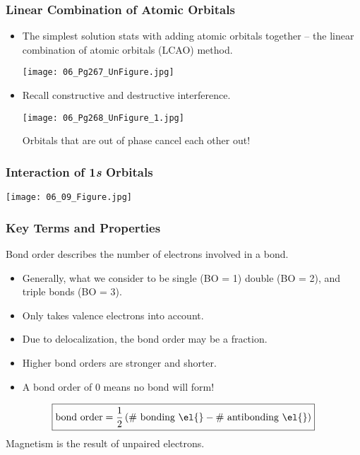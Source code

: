 \documentclass[handout]{beamer}
\begin{document}
\begin{frame}[t]
	\frametitle{Linear Combination of Atomic Orbitals}
	\begin{itemize}[<+->]
		\item The \alert{simplest} solution stats with adding atomic
			orbitals together -- the \alert{linear combination of
			atomic orbitals} (LCAO) method.
			\begin{center}
				\texttt{[image: 06\_Pg267\_UnFigure.jpg]}
			\end{center}
		\item Recall \alert{constructive} and \alert{destructive}
			interference.
			\begin{center}
				\texttt{[image: 06\_Pg268\_UnFigure\_1.jpg]}
			\end{center}
			Orbitals that are out of phase cancel each other out!
	\end{itemize}
\end{frame}

\begin{frame}[c]
	\frametitle{Interaction of 1\textit{s} Orbitals}
	\begin{center}
		\texttt{[image: 06\_09\_Figure.jpg]}
	\end{center}
\end{frame}

\begin{frame}[c]
	\frametitle{Key Terms and Properties}
	\alert{Bond order} describes the number of electrons
		involved in a bond.
		\begin{itemize}
			\item Generally, what we consider to be single
				(BO = 1)
				double (BO = 2), and triple bonds (BO =
				3).
			\item Only takes \alert{valence} electrons into
				account.
			\item Due to \alert{delocalization}, the bond
				order may be a fraction.
			\item Higher bond orders are \alert{stronger} and
				\alert{shorter}.
			\item A bond order of 0 means \alert{no} bond
				will form!
		\end{itemize}
		\begin{equation*}
			\boxed{
			\text{bond order} = \frac{1}{2}\left(\text{\#
				bonding \el{}} - \text{\# antibonding
			\el{}}\right)}
	\end{equation*}
	\pause
	\null
	\bigskip
	\alert{Magnetism} is the result of \alert{unpaired}
	electrons.
\end{frame}
\end{document}
